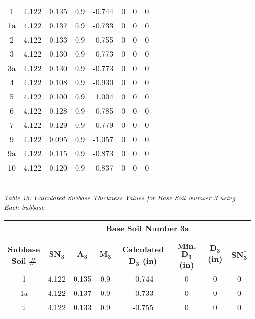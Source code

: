 \documentclass{article}
\begin{document}
\begin{center}
\begin{spacing}{1.6}
\begin{tabular}{|c|ccccccc|}
             1  & 4.122 & 0.135 & 0.9 & -0.744 & 0 & 0&0  \\
             1a & 4.122 & 0.137 & 0.9 & -0.733 & 0 & 0&0  \\
             2  & 4.122 & 0.133 & 0.9 & -0.755 & 0 & 0&0  \\
             3  & 4.122 & 0.130 & 0.9 & -0.773 & 0 & 0&0  \\
             3a & 4.122 & 0.130 & 0.9 & -0.773 & 0 & 0&0  \\
             4  & 4.122 & 0.108 & 0.9 & -0.930 & 0 & 0&0  \\
             5  & 4.122 & 0.100 & 0.9 & -1.004 & 0 & 0&0  \\
             6  & 4.122 & 0.128 & 0.9 & -0.785 & 0 & 0&0  \\
             7  & 4.122 & 0.129 & 0.9 & -0.779 & 0 & 0&0  \\
             9  & 4.122 & 0.095 & 0.9 & -1.057 & 0 & 0&0  \\
             9a & 4.122 & 0.115 & 0.9 & -0.873 & 0 & 0&0  \\
             10 & 4.122 & 0.120 & 0.9 & -0.837 & 0 & 0&0 \\\hline
        \end{tabular}
        \vspace{3mm}
        \emph{\\Table 15: Calculated Subbase Thickness Values for Base Soil Number 3 using Each Subbase\\}
        \vspace{7mm}
        \begin{tabular}{|c|ccccccc|}
            \hline    
            \multicolumn{1}{|l}{}                     & \multicolumn{7}{c|}{\textbf{Base Soil Number 3a}}                                              \\\hline
            &&&&&&&\\
             \shortstack[c]{\textbf{Subbase}\\\textbf{Soil \#}} & $\bm{SN_3}$ & $\bm{A_3}$ & $\bm{M_3}$ & \textbf{Calculated $\bm{D_3}$ (in)} & \textbf{Min. $\bm{D_3}$ (in)} & \textbf{$\bm{D_3}$ (in)} & $\bm{SN_3^*}$  \\\hline
             1  & 4.122 & 0.135 & 0.9 & -0.744 & 0 & 0&0  \\
             1a & 4.122 & 0.137 & 0.9 & -0.733 & 0 & 0&0  \\
             2  & 4.122 & 0.133 & 0.9 & -0.755 & 0 & 0&0  \\

\end{tabular}
\end{spacing}
\end{center}
\end{document}
